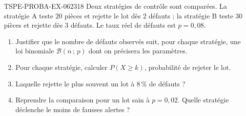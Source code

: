 \begin{exercice}{TSPE-PROBA-EX-062}{3}{18}
Deux stratégies de contrôle sont comparées. La stratégie A teste $20$ pièces
et rejette le lot dès $2$ défauts ; la stratégie B teste $30$ pièces et
rejette dès $3$ défauts. Le taux réel de défauts est $p=0{,}08$.
\begin{enumerate}
  \item Justifier que le nombre de défauts observés suit, pour chaque
        stratégie, une loi binomiale $\mathcal{B}(n\,;\,p)$ dont on précisera
        les paramètres.
  \item Pour chaque stratégie, calculer $P(X\geq k)$, probabilité de rejeter
        le lot.
  \item Laquelle rejette le plus souvent un lot à $8\,\%$ de défauts ?
  \item Reprendre la comparaison pour un lot sain à $p=0{,}02$. Quelle
        stratégie déclenche le moins de fausses alertes ?
\end{enumerate}
\end{exercice}
